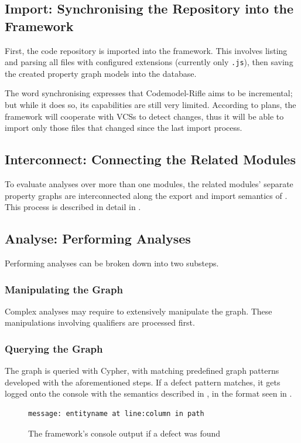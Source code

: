 \subsection{Import: Synchronising the Repository into the Framework}

First, the code repository is imported into the framework. This involves listing and parsing all files with configured extensions (currently only \lstinline{.js}), then saving the created property graph models into the database.

The word synchronising expresses that Codemodel-Rifle aims to be incremental; but while it does so, its capabilities are still very limited. According to plans, the framework will cooperate with VCSs to detect changes, thus it will be able to import only those files that changed since the last import process.


\subsection{Interconnect: Connecting the Related \es Modules}

To evaluate analyses over more than one \es modules, the related modules' separate property graphs are interconnected along the export and import semantics of \es. This process is described in detail in .


\subsection{Analyse: Performing Analyses}

Performing analyses can be broken down into two substeps.


\subsubsection{Manipulating the Graph}

Complex analyses may require to extensively manipulate the graph. These manipulations involving qualifiers are processed first.


\subsubsection{Querying the Graph}

The graph is queried with Cypher, with matching predefined graph patterns developed with the aforementioned steps. If a defect pattern matches, it gets logged onto the console with the semantics described in , in the format seen in .

\begin{figure}[!htb]
	\centering
	\begin{lstlisting}[language=Rifle]
				message: entityname at line:column in path
	\end{lstlisting}
  \caption{The framework's console output if a defect was found}
  \label{fig:defect-found-logger}
\end{figure}